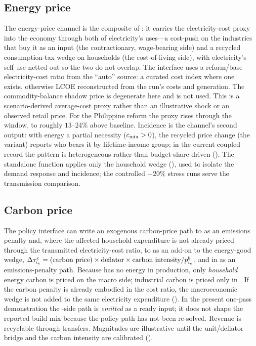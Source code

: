 \subsection{Energy price}\label{sec:ch-energy}
The energy-price channel is the composite of : it carries the \CLEWS{}
electricity-cost proxy into the economy through both of electricity's uses---a cost-push on
the industries that buy it as an input (the contractionary, wage-bearing side) and a
recycled consumption-tax wedge on households (the cost-of-living side), with
electricity's self-use netted out so the two do not overlap. The interface uses a
reform/base electricity-cost ratio from the ``auto'' source: a curated cost index where
one exists, otherwise LCOE reconstructed from the run's costs and generation. The
commodity-balance shadow price is degenerate here and is not used. This is a
scenario-derived average-cost proxy rather than an illustrative shock or an observed
retail price. For the Philippine reform the proxy rises through the window, to roughly
$13$--$24\%$ above baseline.
Incidence is the channel's second output: with
energy a partial necessity ($c_{\min}>0$), the recycled price change (the
 variant) reports who bears it by lifetime-income group; in the
current coupled record the pattern is heterogeneous rather than budget-share-driven
(). The standalone  function applies only the household wedge
(), used to isolate the demand response and incidence; the controlled
$+20\%$ stress runs serve the transmission comparison.

\subsection{Carbon price}\label{sec:ch-carbon}
The policy interface can write an exogenous carbon-price path to \CLEWS{} as an
emissions penalty and, where the affected household expenditure is not already priced
through the transmitted electricity-cost ratio, to \OGCore{} as an add-on to the
energy-good wedge,
$\Delta\tau^{c}_{i_e}=\text{(carbon price)}\times\text{deflator}\times\text{carbon
intensity}/p^{b}_{i_e}$, and in \CLEWS{} as an emissions-penalty path. Because \OGCore{}
has no energy in production, only \emph{household} energy carbon is priced on the macro
side; industrial carbon is priced only in \CLEWS{}. If the carbon penalty is already
embodied in the \CLEWS{} cost ratio, the macroeconomic wedge is not added to the same
electricity expenditure (). In the present one-pass demonstration
the \CLEWS{}-side path is \emph{emitted} as a ready input; it does not shape the reported
build mix because the policy path has not been re-solved. Revenue is recyclable through
transfers. Magnitudes are illustrative until the unit/deflator bridge and the carbon
intensity are calibrated ().

